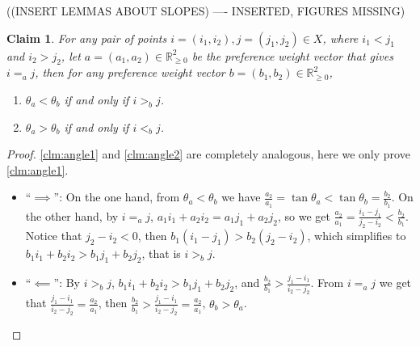 \documentclass[12pt]{article}
\newtheorem{claim}[theorem]{Claim}
\newcommand{\R}{\mathbb{R}}
\newcommand{\1}[1]{\mathds{1}[{#1}]}
\begin{document}
    ((INSERT LEMMAS ABOUT SLOPES) ---- INSERTED, FIGURES MISSING)
    \begin{claim} \label{clm:angle}
      For any pair of points $i = (i_1, i_2), j = (j_1, j_2) \in X$, 
      where $i_1 < j_1$ and $i_2 > j_2$, 
      let $a = (a_1, a_2) \in \R_{\geq 0}^2$ 
      be the preference weight vector that gives $i =_a j$, 
      then for any preference weight vector $b = (b_1, b_2) \in \R_{\geq 0}^2$,\begin{enumerate}
        \vspace{-5pt}
        \item \label{clm:angle1} 
        $\theta_a < \theta_b$ if and only if $i >_b j$.
	\vspace{-5pt}
	\item \label{clm:angle2} 
	$\theta_a > \theta_b$ if and only if $i <_b j$.
      \end{enumerate}
    \end{claim}
    \begin{proof}
      \ref{clm:angle1} and \ref{clm:angle2} are completely analogous, 
      here we only prove \ref{clm:angle1}.
      \begin{itemize}
        \item ``$\implies$'':
        On the one hand, from $\theta_a < \theta_b$ 
        we have $\frac{a_2}{a_1} = \tan{\theta_a} < \tan{\theta_b} = \frac{b_2}{b_1}$.
	On the other hand, by $i =_a j$, 
	$a_1 i_1 + a_2 i_2 = a_1 j_1 + a_2 j_2$, 
	so we get $\frac{a_2}{a_1} = \frac{i_1 - j_1}{j_2 - i_2} < \frac{b_2}{b_1}$.
	Notice that $j_2 - i_2 < 0$, then $b_1 (i_1 - j_1) > b_2 (j_2 - i_2)$, 
	which simplifies to $b_1 i_1 + b_2 i_2 > b_1 j_1 + b_2 j_2$, that is $i >_b j$.

	\item ``$\impliedby$'':
	By $i >_b j$, $b_1 i_1 + b_2 i_2 > b_1 j_1 + b_2 j_2$, 
	and $\frac{b_2}{b_1} > \frac{j_1 - i_1}{i_2 - j_2}$.
	From $i =_a j$ we get that $\frac{j_1 - i_1}{i_2 - j_2} = \frac{a_2}{a_1}$, 
	then $\frac{b_2}{b_1} > \frac{j_1 - i_1}{i_2 - j_2} = \frac{a_2}{a_1}$, 
	$\theta_b > \theta_a$.
      \end{itemize}
    \end{proof}
    
\end{document}
